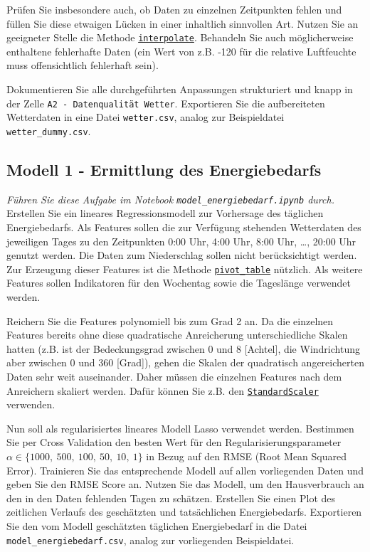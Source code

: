 \documentclass[11pt,a4paper]{article}
\begin{document}
Prüfen Sie insbesondere auch, ob Daten zu einzelnen Zeitpunkten fehlen und füllen Sie diese etwaigen Lücken in einer inhaltlich sinnvollen Art. Nutzen Sie an geeigneter Stelle die Methode \href{https://pandas.pydata.org/docs/reference/api/pandas.DataFrame.interpolate.html}{\texttt{interpolate}}. Behandeln Sie auch möglicherweise enthaltene fehlerhafte Daten (ein Wert von z.B. -120 für die relative Luftfeuchte muss offensichtlich fehlerhaft sein).

Dokumentieren Sie alle durchgeführten Anpassungen strukturiert und knapp in der Zelle \texttt{A2 - Datenqualität Wetter}. Exportieren Sie die aufbereiteten Wetterdaten in eine Datei \texttt{wetter.csv}, analog zur Beispieldatei \texttt{wetter\_dummy.csv}.

\subsection*{Modell 1 - Ermittlung des Energiebedarfs}
\emph{Führen Sie diese Aufgabe im Notebook \texttt{model\_energiebedarf.ipynb} durch.}\\
Erstellen Sie ein lineares Regressionsmodell zur Vorhersage des täglichen Energiebedarfs. Als Features sollen die zur Verfügung stehenden Wetterdaten des jeweiligen Tages zu den Zeitpunkten 0:00 Uhr, 4:00 Uhr, 8:00 Uhr, \dots, 20:00 Uhr genutzt werden. Die Daten zum Niederschlag sollen nicht berücksichtigt werden. Zur Erzeugung dieser Features ist die Methode \href{https://pandas.pydata.org/docs/reference/api/pandas.pivot_table.html}{\texttt{pivot\_table}} nützlich. Als weitere Features sollen Indikatoren für den Wochentag sowie die Tageslänge verwendet werden.

Reichern Sie die Features polynomiell bis zum Grad 2 an. Da die einzelnen Features bereits ohne diese quadratische Anreicherung unterschiedliche Skalen hatten (z.B. ist der Bedeckungsgrad zwischen 0 und 8 [Achtel], die Windrichtung aber zwischen 0 und 360 [Grad]), gehen die Skalen der quadratisch angereicherten Daten sehr weit auseinander. Daher müssen die einzelnen Features nach dem Anreichern skaliert werden. Dafür können Sie z.B. den \href{https://scikit-learn.org/stable/modules/generated/sklearn.preprocessing.StandardScaler.html#sklearn.preprocessing.StandardScaler}{\texttt{StandardScaler}} verwenden.

Nun soll als regularisiertes lineares Modell Lasso verwendet werden. Bestimmen Sie per Cross Validation den besten Wert für den Regularisierungsparameter $\alpha\in\lbrace 1000,\ 500,\ 100,\ 50,\ 10,\ 1\rbrace$ in Bezug auf den RMSE (Root Mean Squared Error). Trainieren Sie das entsprechende Modell auf allen vorliegenden Daten und geben Sie den RMSE Score an.
Nutzen Sie das Modell, um den Hausverbrauch an den in den Daten fehlenden Tagen zu schätzen. Erstellen Sie einen Plot des zeitlichen Verlaufs des geschätzten und tatsächlichen Energiebedarfs. Exportieren Sie den vom Modell geschätzten täglichen Energiebedarf in die Datei \texttt{model\_energiebedarf.csv}, analog zur vorliegenden Beispieldatei.
\end{document}
